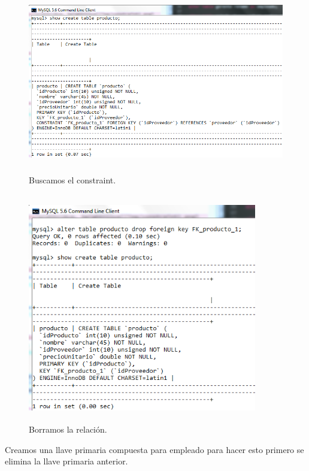 \documentclass[12pt, titlepage]{article}
\begin{document}
\begin{figure}[H]
    \begin{center}
        \includegraphics[width=15cm, height=8cm]{img/constraint1.png}
        \caption{Buscamos el constraint.}
        \label{fig:arlter11}
    \end{center}
\end{figure}
\begin{figure}[H]
    \begin{center}
        \includegraphics[width=10cm, height=10cm]{img/constraint2.png}
        \caption{Borramos la relación.}
        \label{fig:arlter12}
    \end{center}
\end{figure}
Creamos una llave primaria compuesta para empleado para hacer esto primero se elimina la llave primaria anterior.
\end{document}
